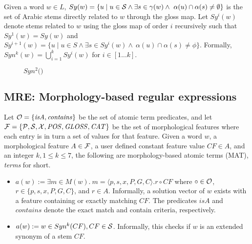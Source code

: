 Given a word $w\in L$, 
$Sy(w)=\{u\mid u\in \ss \land\exists s\in \gamma(w)\land~\alpha(u)\cap\alpha(s)\neq\emptyset\}$
is the set of Arabic stems 
directly related to $w$ through the gloss map.
%
Let $Sy^{i}(w)$ denote stems related to $w$ using the gloss map of order $i$ recursively such that
$Sy^{1}(w) = Sy(w)$ and
$Sy^{i+1}(w)=\{u\mid u\in S\land\exists s\in Sy^{i}(w)\land~\alpha(u)\cap\alpha(s)\neq\phi\}$.
Formally, $Syn^k(w) = \bigcup\limits_{i=1}^{k} Sy^{i}(w)$ for $i\in[1 \ldots k]$.
%

\begin{figure}[tb!]
\begin{center}
\vspace{-2.5em}
\caption{$Syn^2($$)$}
\vspace{-3em}
\label{fig:introsynEx}
\end{center}
\end{figure}

\subsection{MRE: Morphology-based regular expressions}

Let ${\cal O} = \{ \mathit{isA}, \mathit{contains}\}$ be the set of atomic term 
predicates, and let ${\cal F} = \{ \pp, \ss, \xx, \PP, \GG, \AC\}$ be the 
set of morphological features where each entry is in turn a set of values for that feature.
Given a word $w$, a morphological feature $A\in{\cal F}$, 
a user defined constant feature value $CF\in A$, and an integer 
$k, 1\le k\le 7$, 
the following are morphology-based atomic terms (MAT), {\em terms} for short.
\begin{itemize}
  \item $a(w):= \exists m \in M(w).~m=\langle p,s,x,P,G,C\rangle. r \circ CF$
where $\circ \in {\cal O}$, $r \in \{p,s,x,P,G,C\}$, and $r\in A$.
Informally, a solution vector of $w$ exists with
a feature containing or exactly matching $CF$.
The predicates $\mathit{isA}$ and $\mathit{contains}$ denote the exact match and contain criteria, respectively.
\item $a(w) := w \in Syn^k(CF), CF \in \ss$.
  Informally, this checks if $w$ is an extended synonym of a stem $CF$. 
\end{itemize}

